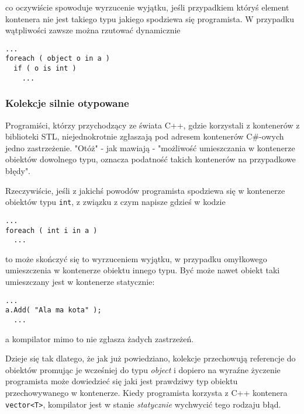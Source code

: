 co oczywiście spowoduje wyrzucenie wyjątku, jeśli przypadkiem któryś element kontenera nie jest 
takiego typu jakiego spodziewa się programista. W przypadku wątpliwości zawsze można rzutować
dynamicznie

\begin{scriptsize}
\begin{verbatim}
...
foreach ( object o in a )
  if ( o is int )
    ...
\end{verbatim}
\end{scriptsize}

\subsubsection{Kolekcje silnie otypowane}

Programiści, którzy przychodzący ze świata C++, gdzie korzystali z kontenerów z biblioteki STL, niejednokrotnie
zgłaszają pod adresem kontenerów C\#-owych jedno zastrzeżenie. "Otóż" - jak mawiają - "możliwość umieszczania
w kontenerze obiektów dowolnego typu, oznacza podatność takich kontenerów na przypadkowe błędy". 

Rzeczywiście, jeśli z jakichś powodów programista spodziewa się w kontenerze obiektów typu {\tt int}, z związku
z czym napisze gdzieś w kodzie

\begin{scriptsize}
\begin{verbatim}
...
foreach ( int i in a )
  ...
\end{verbatim}
\end{scriptsize}

to może skończyć się to wyrzuceniem wyjątku, w przypadku omyłkowego umieszczenia w kontenerze obiektu innego
typu. Być może nawet obiekt taki umieszczany jest w kontenerze statycznie:

\begin{scriptsize}
\begin{verbatim}
...
a.Add( "Ala ma kota" );
  ...
\end{verbatim}
\end{scriptsize}

a kompilator mimo to nie zgłasza żadych zastrzeżeń. 

Dzieje się tak dlatego, że jak już powiedziano, kolekcje przechowują referencje do obiektów promując je
wcześniej do typu {\em object} i dopiero na wyraźne życzenie programista może dowiedzieć się jaki
jest prawdziwy typ obiektu przechowywanego w kontenerze. Kiedy programista korzysta z C++ kontenera
{\tt vector<T>}, kompilator jest w stanie {\em statycznie} wychwycić tego rodzaju błąd.

